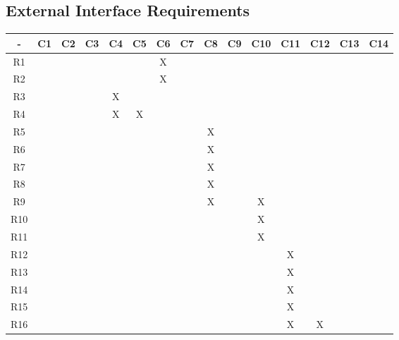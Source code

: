 	\subsection {External Interface Requirements}
	
	\begin{table}[]
\begin{tabular}{|c|c|c|c|c|c|c|c|c|c|c|c|c|c|c|}
\hline
-         & C1 & C2 & C3 & C4 & C5 & C6 & C7 & C8 & C9 & C10 & C11 & C12 & C13 & C14 \\ \hline
R1        &    &    &    &    &    & X  &    &    &    &     &     &     &     &     \\ \hline
R2        &    &    &    &    &    & X  &    &    &    &     &     &     &     &     \\ \hline
R3        &    &    &    & X  &    &    &    &    &    &     &     &     &     &     \\ \hline
R4        &    &    &    & X  & X  &    &    &    &    &     &     &     &     &     \\ \hline
R5        &    &    &    &    &    &    &    & X  &    &     &     &     &     &     \\ \hline
R6        &    &    &    &    &    &    &    & X  &    &     &     &     &     &     \\ \hline
R7        &    &    &    &    &    &    &    & X  &    &     &     &     &     &     \\ \hline
R8        &    &    &    &    &    &    &    & X  &    &     &     &     &     &     \\ \hline
R9        &    &    &    &    &    &    &    & X  &    & X   &     &     &     &     \\ \hline
R10       &    &    &    &    &    &    &    &    &    & X   &     &     &     &     \\ \hline
R11       &    &    &    &    &    &    &    &    &    & X   &     &     &     &     \\ \hline
R12       &    &    &    &    &    &    &    &    &    &     & X   &     &     &     \\ \hline
R13       &    &    &    &    &    &    &    &    &    &     & X   &     &     &     \\ \hline
R14       &    &    &    &    &    &    &    &    &    &     & X   &     &     &     \\ \hline
R15       &    &    &    &    &    &    &    &    &    &     & X   &     &     &     \\ \hline
R16  &    &    &    &    &    &    &    &    &    &     & X   & X   &     &     \\ \hline

\end{tabular}
\end{table}
